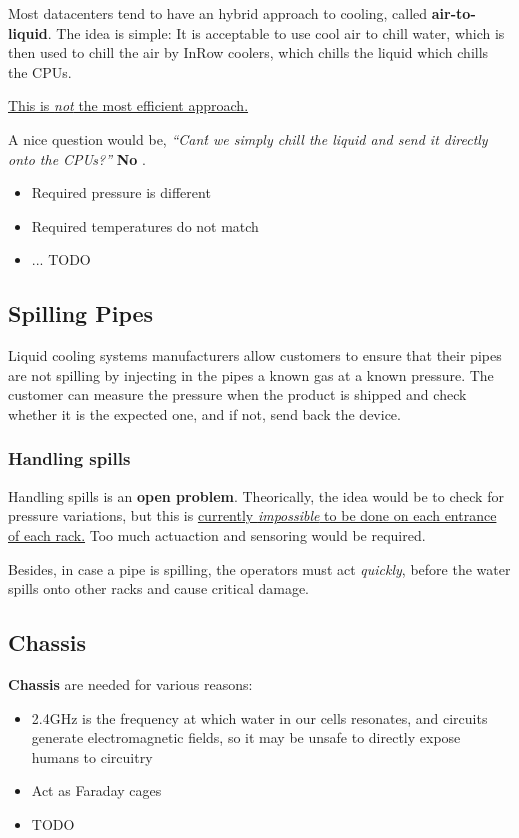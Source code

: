 \nl

Most datacenters tend to have an hybrid approach to cooling, called \textbf{air-to-liquid}.
The idea is simple:
It is acceptable to use cool air to chill water, which is then used to chill the air by InRow coolers, which chills the liquid which chills the CPUs.

\ul{This is \textit{not} the most efficient approach.}

A nice question would be, \textit{``Can\'t we simply chill the liquid and send it directly onto the CPUs?''} \textbf{No} \smiley.
\begin{itemize}
   \item Required pressure is different
   \item Required temperatures do not match
   \item ... TODO 
\end{itemize}

\subsection{Spilling Pipes}
Liquid cooling systems manufacturers allow customers to ensure that their pipes are not spilling by injecting in the pipes a known gas at a known pressure.
The customer can measure the pressure when the product is shipped and check whether it is the expected one, and if not, send back the device.

\subsubsection*{Handling spills}
Handling spills is an \textbf{open problem}. 
Theorically, the idea would be to check for pressure variations, but this is \ul{currently \textit{impossible} to be done on each entrance of each rack.}
Too much actuaction and sensoring would be required.

Besides, in case a pipe is spilling, the operators must act \textit{quickly}, before the water spills onto other racks and cause critical damage. 

\subsection{Chassis}
\textbf{Chassis} are needed for various reasons:
\begin{itemize}
   \item 2.4GHz is the frequency at which water in our cells resonates, and circuits generate electromagnetic fields, so it may be unsafe to directly expose humans to circuitry
   \item Act as Faraday cages
   \item TODO
\end{itemize}